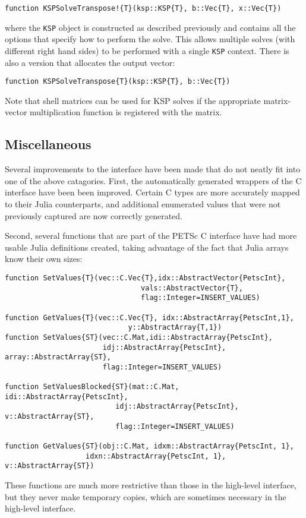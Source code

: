 \documentclass{article}
\begin{document}
\begin{verbatim}
function KSPSolveTranspose!{T}(ksp::KSP{T}, b::Vec{T}, x::Vec{T})
\end{verbatim}

where the \texttt{KSP} object is constructed as described previously and 
contains all the options that specify how to perform the solve.  This
allows multiple solves (with different right hand sides) to be performed 
with a single \texttt{KSP} context.  There is also a version that allocates 
the output vector:

\begin{verbatim}
function KSPSolveTranspose{T}(ksp::KSP{T}, b::Vec{T})
\end{verbatim}

Note that shell matrices can be used for KSP solves if the appropriate 
matrix-vector multiplication function is registered with the matrix.

\subsection{Miscellaneous}
Several improvements to the interface have been made that do not neatly fit 
into one of the above catagories.
First, the automatically generated wrappers of the C interface have been 
been improved.  Certain C types are more accurately mapped to their Julia 
counterparts, and additional enumerated values that were not previously
captured are now correctly generated.

Second, several functions that are part of the PETSc C interface have had
more usable Julia definitions created, taking advantage of the fact that Julia
arrays know their own sizes:

\begin{verbatim}
function SetValues{T}(vec::C.Vec{T},idx::AbstractVector{PetscInt},
                                vals::AbstractVector{T},
                                flag::Integer=INSERT_VALUES)

function GetValues{T}(vec::C.Vec{T}, idx::AbstractArray{PetscInt,1}, 
                             y::AbstractArray{T,1})
function SetValues{ST}(vec::C.Mat,idi::AbstractArray{PetscInt},
                       idj::AbstractArray{PetscInt}, array::AbstractArray{ST},
                       flag::Integer=INSERT_VALUES)

function SetValuesBlocked{ST}(mat::C.Mat, idi::AbstractArray{PetscInt}, 
                          idj::AbstractArray{PetscInt}, v::AbstractArray{ST}, 
                          flag::Integer=INSERT_VALUES)

function GetValues{ST}(obj::C.Mat, idxm::AbstractArray{PetscInt, 1}, 
                   idxn::AbstractArray{PetscInt, 1}, v::AbstractArray{ST})
\end{verbatim}

\noindent These functions are much more restrictive than those in the high-level
interface, but they never make temporary copies, which are sometimes 
necessary in the high-level interface.
\end{document}
